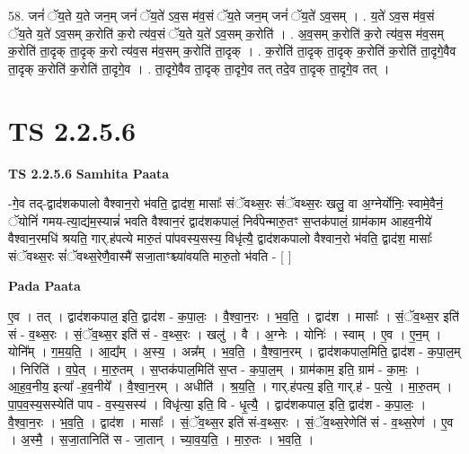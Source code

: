 \documentclass[17pt]{extarticle}
\begin{document}
58. जनं॑ ॅय॒ते य॒ते जन॒म् जनं॑ ॅय॒ते॑ ऽव॒स म॑व॒सं ॅय॒ते जन॒म् जनं॑ ॅय॒ते॑ ऽव॒सम् । . य॒ते॑ ऽव॒स म॑व॒सं ॅय॒ते य॒ते॑ ऽव॒सम् क॒रोति॑ क॒रो त्य॑व॒सं ॅय॒ते य॒ते॑ ऽव॒सम् क॒रोति॑ । . अ॒व॒सम् क॒रोति॑ क॒रो त्य॑व॒स म॑व॒सम् क॒रोति॑ ता॒दृक् ता॒दृक् क॒रो त्य॑व॒स म॑व॒सम् क॒रोति॑ ता॒दृक् । . क॒रोति॑ ता॒दृक् ता॒दृक् क॒रोति॑ क॒रोति॑ ता॒दृगे॒वैव ता॒दृक् क॒रोति॑ क॒रोति॑ ता॒दृगे॒व । . ता॒दृगे॒वैव ता॒दृक् ता॒दृगे॒व तत् तदे॒व ता॒दृक् ता॒दृगे॒व तत् । \newline
\pagebreak
{}

\section{ TS 2.2.5.6 }

\textbf{TS 2.2.5.6 } \newline
\textbf{Samhita Paata} \newline

-गे॒व तद्-द्वाद॑शकपालो वैश्वान॒रो भ॑वति॒ द्वाद॑श॒ मासाः᳚ संॅवथ्स॒रः सं॑ॅवथ्स॒रः खलु॒ वा अ॒ग्नेर्योनिः॒ स्वामे॒वैनं॒ ॅयोनिं॑ गमय-त्या॒द्य॑म॒स्यान्नं॑ भवति वैश्वान॒रं द्वाद॑शकपालं॒ निर्व॑पेन्मारु॒तꣳ स॒प्तक॑पालं॒ ग्राम॑काम आहव॒नीये॑ वैश्वान॒रमधि॑ श्रयति॒ गार्.ह॑पत्ये मारु॒तं पा॑पवस्य॒सस्य॒ विधृ॑त्यै॒ द्वाद॑शकपालो वैश्वान॒रो भ॑वति॒ द्वाद॑श॒ मासाः᳚ संॅवथ्स॒रः सं॑ॅवथ्स॒रेणै॒वास्मै॑ सजा॒ताꣳश्च्या॑वयति मारु॒तो भ॑वति - [  ] \newline

\textbf{Pada Paata} \newline

ए॒व । तत् । द्वाद॑शकपाल॒ इति॒ द्वाद॑श - क॒पा॒लः॒ । वै॒श्वा॒न॒रः । भ॒व॒ति॒ । द्वाद॑श । मासाः᳚ । सं॒ॅव॒थ्स॒र इति॑ सं - व॒थ्स॒रः । सं॒ॅव॒थ्स॒र इति॑ सं - व॒थ्स॒रः । खलु॑ । वै । अ॒ग्नेः । योनिः॑ । स्वाम् । ए॒व । ए॒न॒म् । योनि᳚म् । ग॒म॒य॒ति॒ । आ॒द्य᳚म् । अ॒स्य॒ । अन्न᳚म् । भ॒व॒ति॒ । वै॒श्वा॒न॒रम् । द्वाद॑शकपाल॒मिति॒ द्वाद॑श - क॒पा॒ल॒म् । निरिति॑ । व॒पे॒त् । मा॒रु॒तम् । स॒प्तक॑पाल॒मिति॑ स॒प्त - क॒पा॒ल॒म् । ग्राम॑काम॒ इति॒ ग्राम॑ - का॒मः॒ । आ॒ह॒व॒नीय॒ इत्या᳚ -ह॒व॒नीये᳚ । वै॒श्वा॒न॒रम् । अधीति॑ । श्र॒य॒ति॒ । गार्.ह॑पत्य॒ इति॒ गार्.ह॑ - प॒त्ये॒ । मा॒रु॒तम् । पा॒प॒व॒स्य॒सस्येति॑ पाप - व॒स्य॒सस्य॑ । विधृ॑त्या॒ इति॒ वि - धृ॒त्यै॒ । द्वाद॑शकपाल॒ इति॒ द्वाद॑श - क॒पा॒लः॒ । वै॒श्वा॒न॒रः । भ॒व॒ति॒ । द्वाद॑श । मासाः᳚ । सं॒ॅव॒थ्स॒र इति॑ सं-व॒थ्स॒रः । सं॒ॅव॒थ्स॒रेणेति॑ सं - व॒थ्स॒रेण॑ । ए॒व । अ॒स्मै॒ । स॒जा॒तानिति॑ स - जा॒तान् । च्या॒व॒य॒ति॒ । मा॒रु॒तः । भ॒व॒ति॒ ।  \newline
\end{document}
